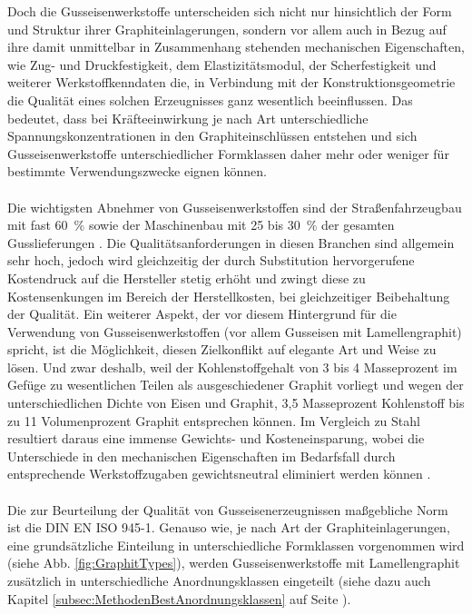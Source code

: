 \documentclass[
fontsize=10pt, 
listof = totoc,
parskip = half	
]{report}
\begin{document}
\noindent Doch die Gusseisenwerkstoffe unterscheiden sich nicht nur hinsichtlich der Form und Struktur ihrer Graphiteinlagerungen, sondern vor allem auch in Bezug auf ihre damit unmittelbar in Zusammenhang stehenden mechanischen Eigenschaften, wie Zug- und Druckfestigkeit, dem Elastizitätsmodul, der Scherfestigkeit und weiterer Werkstoffkenndaten die, in Verbindung mit der Konstruktionsgeometrie die Qualität eines solchen Erzeugnisses ganz wesentlich beeinflussen. Das bedeutet, dass bei Kräfteeinwirkung je nach Art unterschiedliche Spannungskonzentrationen in den Graphiteinschlüssen entstehen und sich Gusseisenwerkstoffe unterschiedlicher Formklassen daher mehr oder weniger für bestimmte Verwendungszwecke eignen können. 
\\\\
\noindent Die wichtigsten Abnehmer von Gusseisenwerkstoffen sind der Straßenfahrzeugbau mit fast 60~\% sowie der Maschinenbau mit 25 bis 30~\% der gesamten Gusslieferungen \cite{BDGuss01}. Die Qualitätsanforderungen in diesen Branchen sind allgemein sehr hoch, jedoch wird gleichzeitig der  durch Substitution hervorgerufene Kostendruck auf die Hersteller stetig erhöht und zwingt diese zu Kostensenkungen im Bereich der Herstellkosten, bei gleichzeitiger Beibehaltung der Qualität. Ein weiterer Aspekt, der vor diesem Hintergrund für die Verwendung von Gusseisenwerkstoffen (vor allem Gusseisen mit Lamellengraphit) spricht, ist die Möglichkeit, diesen Zielkonflikt auf elegante Art und Weise zu lösen. Und zwar deshalb, weil der Kohlenstoffgehalt von 3 bis 4 Masseprozent im Gefüge zu wesentlichen Teilen als ausgeschiedener Graphit vorliegt und wegen der unterschiedlichen Dichte von Eisen und Graphit, 3,5 Masseprozent Kohlenstoff bis zu 11 Volumenprozent Graphit entsprechen können. Im Vergleich zu Stahl resultiert daraus eine immense Gewichts- und Kosteneinsparung, wobei die Unterschiede in den mechanischen Eigenschaften im Bedarfsfall durch entsprechende Werkstoffzugaben gewichtsneutral eliminiert werden können \cite{BDGuss02}.
\\\\
Die zur Beurteilung der Qualität von Gusseisenerzeugnissen maßgebliche Norm ist die DIN EN ISO 945-1. Genauso wie, je nach Art der Graphiteinlagerungen, eine grundsätzliche Einteilung in unterschiedliche Formklassen vorgenommen wird (siehe Abb. \ref{fig:GraphitTypes}), werden Gusseisenwerkstoffe mit Lamellengraphit zusätzlich in unterschiedliche Anordnungsklassen eingeteilt (siehe dazu auch Kapitel \ref{subsec:MethodenBestAnordnungsklassen} auf Seite \pageref{subsec:MethodenBestAnordnungsklassen}).
\end{document}
